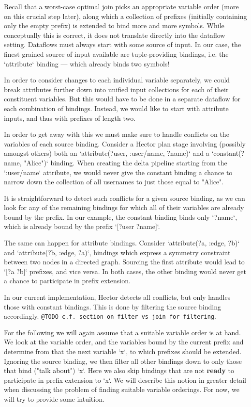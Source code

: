 \documentclass[../index.tex]{subfiles}
\begin{document}
Recall that a worst-case optimal join picks an appropriate variable
order (more on this crucial step later), along which a collection of
prefixes (initially containing only the empty prefix) is extended to
bind more and more symbols. While conceptually this is correct, it
does not translate directly into the dataflow setting. Dataflows must
always start with some source of input. In our case, the finest
grained source of input available are tuple-providing bindings,
i.e. the `attribute` binding — which already binds two symbols!

In order to consider changes to each individual variable separately,
we could break attributes further down into unified input collections
for each of their constituent variables. But this would have to be
done in a separate dataflow for each combination of bindings. Instead,
we would like to start with attribute inputs, and thus with prefixes
of length two.

In order to get away with this we must make sure to handle conflicts
on the variables of each source binding. Consider a Hector plan stage
involving (possibly amongst others) both an `attribute(?user,
:user/name, ?name)` and a `constant(?name, "Alice")` binding. When
creating the delta pipeline starting from the `:user/name` attribute,
we would never give the constant binding a chance to narrow down the
collection of all usernames to just those equal to "Alice".

It is straightforward to detect such conflicts for a given source
binding, as we can look for any of the remaining bindings for which
all of their variables are already bound by the prefix. In our
example, the constant binding binds only `?name`, which is already
bound by the prefix `[?user ?name]`.

The same can happen for attribute bindings. Consider `attribute(?a,
:edge, ?b)` and `attribute(?b, :edge, ?a)`, bindings which express a
symmetry constraint between two nodes in a directed graph. Sourcing
the first attribute would lead to `[?a ?b]` prefixes, and vice
versa. In both cases, the other binding would never get a chance to
participate in prefix extension.

In our current implementation, Hector detects all conflicts, but only
handles those with constant bindings. This is done by filtering the
source binding accordingly. \texttt{@TODO c.f. section on filter vs join for
filtering}.

For the following we will again assume that a suitable variable order
is at hand. We look at the variable order, and the variables bound by
the current prefix and determine from that the next variable `x`, to
which prefixes should be extended. Ignoring the source binding, we
then filter all other bindings down to only those that bind ("talk
about") `x`. Here we also skip bindings that are not \textbf{ready} to
participate in prefix extension to `x`. We will describe this notion
in greater detail when discussing the problem of finding suitable
variable orderings. For now, we will try to provide some intuition.
\end{document}
